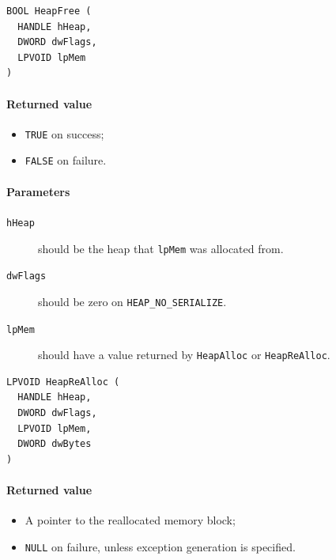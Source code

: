 \begin{verbatim}
BOOL HeapFree (
  HANDLE hHeap,
  DWORD dwFlags,
  LPVOID lpMem
)
\end{verbatim}

\paragraph{Returned value}
\begin{itemize}
\item \texttt{TRUE} on success;
\item \texttt{FALSE} on failure.
\end{itemize}

\paragraph{Parameters}
\begin{description}
\item [\texttt{hHeap}] should be the heap that \texttt{lpMem} was allocated from.
\item [\texttt{dwFlags}] should be zero on \texttt{HEAP\_NO\_SERIALIZE}.
\item [\texttt{lpMem}] should have a value returned by \texttt{HeapAlloc} or \texttt{HeapReAlloc}.
\end{description}

\begin{verbatim}
LPVOID HeapReAlloc (
  HANDLE hHeap,
  DWORD dwFlags,
  LPVOID lpMem,
  DWORD dwBytes
)
\end{verbatim}

\paragraph{Returned value}
\begin{itemize}
\item A pointer to the reallocated memory block;
\item \texttt{NULL} on failure, unless exception generation is specified.
\end{itemize}

